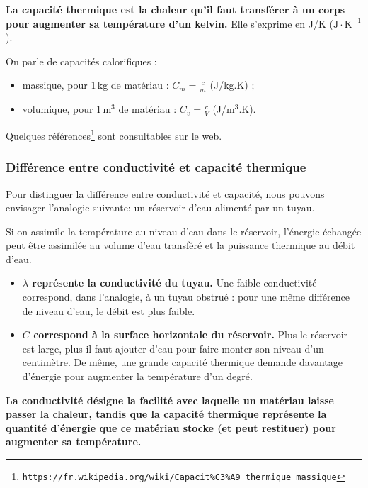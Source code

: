\textbf{La capacité thermique est la chaleur qu'il faut transférer à un corps pour augmenter sa température d'un kelvin.} Elle s'exprime en J/K ($\mathrm{J\cdot K^{-1}}$).

On parle de capacités calorifiques :
\begin{itemize}
  \item massique, pour 1\,kg de matériau : $\displaystyle C_m = \frac{c}{m}$ \quad (J/kg.K) ;
  \item volumique, pour 1\,m$^3$ de matériau : $\displaystyle C_v = \frac{c}{V}$ \quad (J/m$^3$.K).
\end{itemize}

Quelques références\footnote{\texttt{https://fr.wikipedia.org/wiki/Capacit\%C3\%A9\_thermique\_massique}} sont consultables sur le web.

\subsubsection{Différence entre conductivité et capacité thermique}
Pour distinguer la différence entre conductivité et capacité, nous pouvons envisager l'analogie suivante: un réservoir d'eau alimenté par un tuyau.

Si on assimile la température au niveau d'eau dans le réservoir, l'énergie échangée peut être assimilée au volume d'eau transféré et la puissance thermique au débit d'eau.

\begin{itemize}
  \item \textbf{$\lambda$ représente la conductivité du tuyau.}
   Une faible conductivité correspond, dans l'analogie, à un tuyau obstrué : pour une même différence de niveau d'eau, le débit est plus faible.

  \item \textbf{$C$ correspond à la surface horizontale du réservoir.}
  Plus le réservoir est large, plus il faut ajouter d'eau pour faire monter son niveau d'un centimètre.
  De même, une grande capacité thermique demande davantage d'énergie pour augmenter la température d'un degré.
\end{itemize}

\textbf{La conductivité désigne la facilité avec laquelle un matériau laisse passer la chaleur, tandis que la capacité thermique représente la quantité d’énergie que ce matériau stocke (et peut restituer) pour augmenter sa température.}